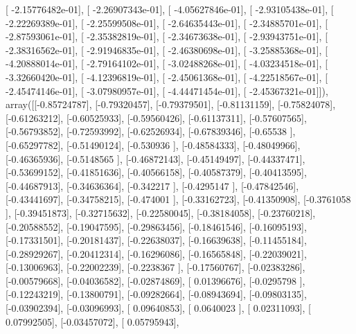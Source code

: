 \documentclass{article}
\begin{document}
       [ -2.15776482e-01],
       [ -2.26907343e-01],
       [ -4.05627846e-01],
       [ -2.93105438e-01],
       [ -2.22269389e-01],
       [ -2.25599508e-01],
       [ -2.64635443e-01],
       [ -2.34885701e-01],
       [ -2.87593061e-01],
       [ -2.35382819e-01],
       [ -2.34673638e-01],
       [ -2.93943751e-01],
       [ -2.38316562e-01],
       [ -2.91946835e-01],
       [ -2.46380698e-01],
       [ -3.25885368e-01],
       [ -4.20888014e-01],
       [ -2.79164102e-01],
       [ -3.02488268e-01],
       [ -4.03234518e-01],
       [ -3.32660420e-01],
       [ -4.12396819e-01],
       [ -2.45061368e-01],
       [ -4.22518567e-01],
       [ -2.45474146e-01],
       [ -3.07980957e-01],
       [ -4.44471454e-01],
       [ -2.45367321e-01]]), array([[-0.85724787],
       [-0.79320457],
       [-0.79379501],
       [-0.81131159],
       [-0.75824078],
       [-0.61263212],
       [-0.60525933],
       [-0.59560426],
       [-0.61137311],
       [-0.57607565],
       [-0.56793852],
       [-0.72593992],
       [-0.62526934],
       [-0.67839346],
       [-0.65538   ],
       [-0.65297782],
       [-0.51490124],
       [-0.530936  ],
       [-0.48584333],
       [-0.48049966],
       [-0.46365936],
       [-0.5148565 ],
       [-0.46872143],
       [-0.45149497],
       [-0.44337471],
       [-0.53699152],
       [-0.41851636],
       [-0.40566158],
       [-0.40587379],
       [-0.40413595],
       [-0.44687913],
       [-0.34636364],
       [-0.342217  ],
       [-0.4295147 ],
       [-0.47842546],
       [-0.43441697],
       [-0.34758215],
       [-0.474001  ],
       [-0.33162723],
       [-0.41350908],
       [-0.3761058 ],
       [-0.39451873],
       [-0.32715632],
       [-0.22580045],
       [-0.38184058],
       [-0.23760218],
       [-0.20588552],
       [-0.19047595],
       [-0.29863456],
       [-0.18461546],
       [-0.16095193],
       [-0.17331501],
       [-0.20181437],
       [-0.22638037],
       [-0.16639638],
       [-0.11455184],
       [-0.28929267],
       [-0.20412314],
       [-0.16296086],
       [-0.16565848],
       [-0.22039021],
       [-0.13006963],
       [-0.22002239],
       [-0.2238367 ],
       [-0.17560767],
       [-0.02383286],
       [-0.00579668],
       [-0.04036582],
       [-0.02874869],
       [ 0.01396676],
       [-0.0295798 ],
       [-0.12243219],
       [-0.13800791],
       [-0.09282664],
       [-0.08943694],
       [-0.09803135],
       [-0.03902394],
       [-0.03096993],
       [ 0.09640853],
       [ 0.0640023 ],
       [ 0.02311093],
       [ 0.07992505],
       [-0.03457072],
       [ 0.05795943],
\end{document}
